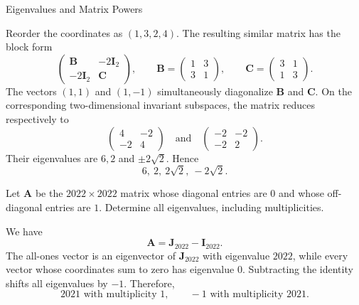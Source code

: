 \begin{expectedproblemgroup}{Eigenvalues and Matrix Powers}
        \begin{expectedsubsolution}
            Reorder the coordinates as $(1,3,2,4)$. The resulting similar
            matrix has the block form
            \[
                \begin{pmatrix}
                    \mathbf{B} & -2\mathbf{I}_2\\
                    -2\mathbf{I}_2 & \mathbf{C}
                \end{pmatrix},
                \qquad
                \mathbf{B}
                =
                \begin{pmatrix}
                    1&3\\3&1
                \end{pmatrix},
                \qquad
                \mathbf{C}
                =
                \begin{pmatrix}
                    3&1\\1&3
                \end{pmatrix}.
            \]
            The vectors $(1,1)$ and $(1,-1)$ simultaneously diagonalize
            $\mathbf{B}$ and $\mathbf{C}$. On the corresponding two-dimensional
            invariant subspaces, the matrix reduces respectively to
            \[
                \begin{pmatrix}
                    4&-2\\-2&4
                \end{pmatrix}
                \quad\text{and}\quad
                \begin{pmatrix}
                    -2&-2\\-2&2
                \end{pmatrix}.
            \]
            Their eigenvalues are $6,2$ and $\pm2\sqrt2$. Hence
            \[
                \boxed{6,\ 2,\ 2\sqrt2,\ -2\sqrt2}.
            \]
        \end{expectedsubsolution}

        \begin{expectedsubproblem}
            Let $\mathbf{A}$ be the $2022\times2022$ matrix whose diagonal
            entries are $0$ and whose off-diagonal entries are $1$. Determine
            all eigenvalues, including multiplicities.
        \end{expectedsubproblem}

        \begin{expectedsubsolution}
            We have
            \[
                \mathbf{A}=\mathbf{J}_{2022}-\mathbf{I}_{2022}.
            \]
            The all-ones vector is an eigenvector of $\mathbf{J}_{2022}$ with
            eigenvalue $2022$, while every vector whose coordinates sum to zero
            has eigenvalue $0$. Subtracting the identity shifts all eigenvalues
            by $-1$. Therefore,
            \[
                \boxed{
                    2021\text{ with multiplicity }1,
                    \qquad
                    -1\text{ with multiplicity }2021
                }.
            \]
        \end{expectedsubsolution}


\end{expectedproblemgroup}
